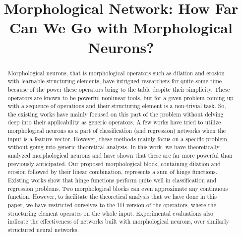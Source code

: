 \documentclass{bmvc2k}
\title{Morphological Network: How Far Can We Go with Morphological Neurons?}
\begin{document}
\maketitle

\begin{abstract}
Morphological neurons, that is morphological operators such as dilation and erosion with learnable structuring elements, have intrigued researchers for quite some time because of the power these operators bring to the table despite their simplicity. These operators are known to be powerful nonlinear tools, but for a given problem coming up with a sequence of operations and their structuring element is a non-trivial task. So, the existing works have mainly focused on this part of the problem without delving deep into their applicability as generic operators. A few works have tried to utilize morphological neurons as a part of classification (and regression) networks when the input is a feature vector. However, these methods mainly focus on a specific problem, without going into generic theoretical analysis. In this work, we have theoretically analyzed morphological neurons and have shown that these are far more powerful than previously anticipated. Our proposed morphological block, containing dilation and erosion followed by their linear combination, represents a sum of hinge functions. Existing works show that hinge functions perform quite well in classification and regression problems. Two morphological blocks can even approximate any continuous function. However, to facilitate the theoretical analysis that we have done in this paper, we have restricted ourselves to the 1D version of the operators, where the structuring element operates on the whole input. Experimental evaluations also indicate the effectiveness of networks built with morphological neurons, over similarly structured neural networks.


\end{abstract}
\end{document}
